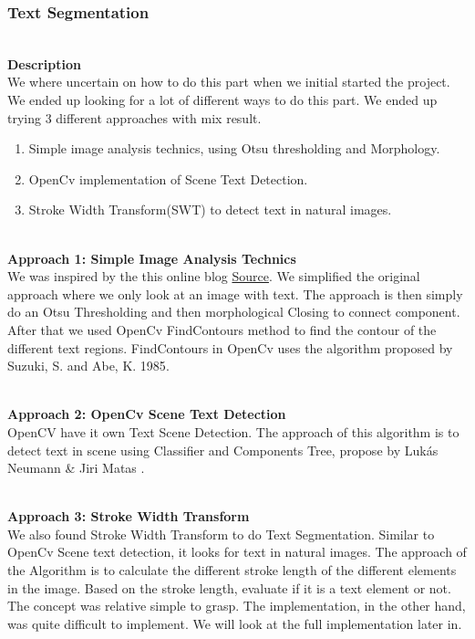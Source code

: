 \documentclass[11pt,a4paper,UKenglish]{article}
\begin{document}
\subsubsection{Text Segmentation}\label{Component_Descripton:Text_segmentation}
\noindent \\ \textbf{Description}
\noindent \\ We where uncertain on how to do this part when we initial started the project. We ended up looking for a lot of different ways to do this part. We ended up trying 3 different approaches with mix result.
\begin{enumerate}
  \item Simple image analysis technics, using Otsu thresholding and Morphology.
  \item OpenCv implementation of Scene Text Detection.
  \item Stroke Width Transform(SWT) to detect text in natural images.
\end{enumerate}

\noindent \\ \textbf{Approach 1: Simple Image Analysis Technics}
\noindent \\ We was inspired by the this online blog \href{https://www.danvk.org/2015/01/07/finding-blocks-of-text-in-an-image-using-python-opencv-and-numpy.html}{Source}\cite{_finding_????}. We simplified the original approach where we only look at an image with text. The approach is then simply do an Otsu Thresholding and then morphological Closing to connect component. After that we used OpenCv FindContours method to find the contour of the different text regions. FindContours in OpenCv uses the algorithm proposed by Suzuki, S. and Abe, K. 1985\cite{suzuki_topological_????}.

\noindent \\ \textbf{Approach 2: OpenCv Scene Text Detection}
\noindent \\ OpenCV have it own Text Scene Detection. The approach of this algorithm is to detect text in scene using Classifier and Components Tree, propose by Lukás Neumann \& Jiri Matas \cite{neumann_real-time_2012}.

\noindent \\ \textbf{Approach 3: Stroke Width Transform}
\noindent \\ We also found Stroke Width Transform to do Text Segmentation\cite{epshtein_stroke_2010}. Similar to OpenCv Scene text detection, it looks for text in natural images. The approach of the Algorithm is to calculate the different stroke length of the different elements in the image. Based on the stroke length, evaluate if it is a text element or not. The concept was relative simple to grasp. The implementation, in the other hand, was quite difficult to implement. We will look at the full implementation later in.
\end{document}
